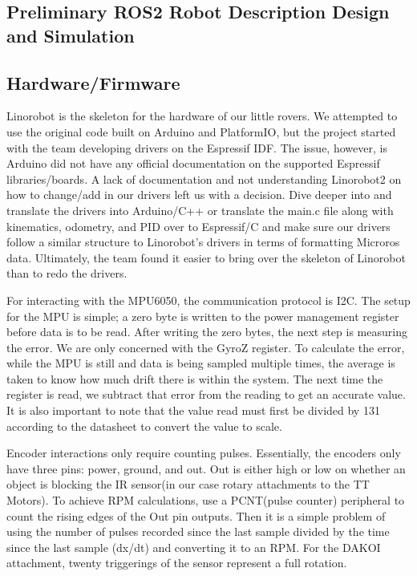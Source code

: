 \documentclass[conference]{IEEEtran}
\begin{document}
\subsection{Preliminary ROS2 Robot Description Design and Simulation}

\subsection{Hardware/Firmware}
Linorobot is the skeleton for the hardware of our little rovers. We attempted to use the original code built on Arduino and PlatformIO, but the project started with the team developing drivers on the Espressif IDF. The issue, however, is Arduino did not have any official documentation on the supported Espressif libraries/boards. A lack of documentation and not understanding Linorobot2 on how to change/add in our drivers left us with a decision. Dive deeper into and translate the drivers into Arduino/C++ or translate the main.c file along with kinematics, odometry, and PID over to Espressif/C and make sure our drivers follow a similar structure to Linorobot’s drivers in terms of formatting Microros data. Ultimately, the team found it easier to bring over the skeleton of Linorobot than to redo the drivers.

 For interacting with the MPU6050, the communication protocol is I2C. The setup for the MPU is simple; a zero byte is written to the power management register before data is to be read. After writing the zero bytes, the next step is measuring the error. We are only concerned with the GyroZ register. To calculate the error, while the MPU is still and data is being sampled multiple times, the average is taken to know how much drift there is within the system. The next time the register is read, we subtract that error from the reading to get an accurate value. It is also important to note that the value read must first be divided by 131 according to the datasheet to convert the value to scale.
 
 Encoder interactions only require counting pulses. Essentially, the encoders only have three pins: power, ground, and out. Out is either high or low on whether an object is blocking the IR sensor(in our case rotary attachments to the TT Motors). To achieve RPM calculations, use a PCNT(pulse counter) peripheral to count the rising edges of the Out pin outputs. Then it is a simple problem of using the number of pulses recorded since the last sample divided by the time since the last sample (dx/dt) and converting it to an RPM. For the DAKOI attachment, twenty triggerings of the sensor represent a full rotation.
 
\end{document}
